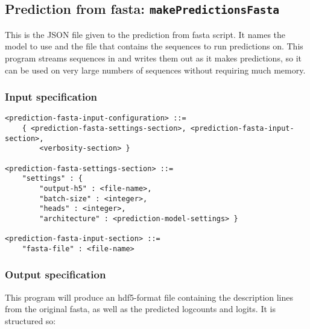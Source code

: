\documentclass{article}
\begin{document}
\newpage

\subsection{Prediction from fasta: \texttt{makePredictionsFasta}}\label{prog:makePredictionsFasta}

This is the JSON file given to the prediction from fasta script. It names the model to use and
the file that contains the sequences to run predictions on.
This program streams sequences in and writes them out as it makes predictions, so it can be used
on very large numbers of sequences without requiring much memory.

\subsubsection{Input specification}

\begin{lstlisting}
<prediction-fasta-input-configuration> ::=
    { <prediction-fasta-settings-section>, <prediction-fasta-input-section>,
        <verbosity-section> }

<prediction-fasta-settings-section> ::=
    "settings" : {
        "output-h5" : <file-name>,
        "batch-size" : <integer>,
        "heads" : <integer>,
        "architecture" : <prediction-model-settings> }

<prediction-fasta-input-section> ::=
    "fasta-file" : <file-name>
\end{lstlisting}

\subsubsection{Output specification}

This program will produce an hdf5-format file containing the description lines from the original
fasta, as well as the predicted logcounts and logits.
It is structured so:
\end{document}

